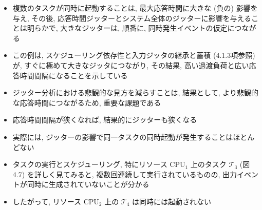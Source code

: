 \begin{frame}{}
    \begin{itemize}
        \item 複数のタスクが同時に起動することは, 最大応答時間に大きな (負の) 影響を与え, その後, 応答時間ジッターとシステム全体のジッターに影響を与えることは明らかで, 大きなジッターは, 順番に, 同時発生イベントの仮定につながる
        \item この例は, スケジューリング依存性と入力ジッタの継承と蓄積 (4.1.3項参照) が, すぐに極めて大きなジッタにつながり, その結果, 高い過渡負荷と広い応答時間間隔になることを示している
        \item ジッター分析における悲観的な見方を減らすことは, 結果として, より悲観的な応答時間につながるため, 重要な課題である
        \item 応答時間間隔が狭くなれば, 結果的にジッターも狭くなる
    \end{itemize}
\end{frame}

\begin{frame}{}
    \begin{itemize}
        \item 実際には, ジッターの影響で同一タスクの同時起動が発生することはほとんどない
        \item タスクの実行とスケジューリング, 特にリソース $\mathrm{CPU}_{1}$ 上のタスク $\mathcal{T}_{3}$  (図4.7) を詳しく見てみると, 複数回連続して実行されているものの, 出力イベントが同時に生成されていないことが分かる
        \item したがって, リソース $\mathrm{CPU}_{2}$ 上の $\mathcal{T}_{4}$ は同時には起動されない
    \end{itemize}
\end{frame}

\begin{frame}{}
\end{frame}

